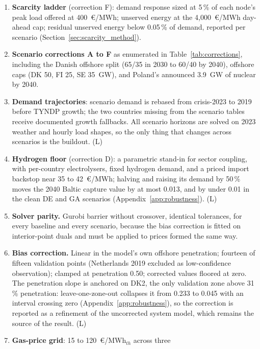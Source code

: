 \begin{enumerate}
    de-rating or reservations). Same direction and same treatment as the
    previous item: absorbed into the measured, corrected bias. (L)
    \item \textbf{Scarcity ladder} (correction F): demand response sized at
    5\,\% of each node's peak load offered at 400~\euro/MWh; unserved
    energy at the 4,000~\euro/MWh day-ahead cap; residual unserved energy
    below 0.05\,\% of demand, reported per scenario
    (Section~\ref{sec:scarcity_method}).
    \item \textbf{Scenario corrections A to F} as enumerated in
    Table~\ref{tab:corrections}, including the Danish offshore split
    (65/35 in 2030 to 60/40 by 2040), offshore caps (DK 50, FI 25, SE 35~GW), and
    Poland's announced 3.9~GW of nuclear by 2040.
    \item \textbf{Demand trajectories}: scenario demand is rebased from
    crisis-2023 to 2019 before TYNDP growth; the two countries missing from the scenario tables receive documented growth
fallbacks. All scenario
    horizons are solved on 2023 weather and hourly load shapes, so the only thing that changes across scenarios is the buildout. (L)
    \item \textbf{Hydrogen floor} (correction D): a parametric stand-in
    for sector coupling, with per-country electrolysers, fixed hydrogen
    demand, and a priced import backstop near 35 to 42~\euro/MWh; halving and
    raising its demand by 50\,\% moves the 2040 Baltic capture value by at most
    0.013, and by under 0.01 in the clean DE and GA scenarios
    (Appendix~\ref{app:robustness}). (L)
    \item \textbf{Solver parity.} Gurobi barrier without crossover,
    identical tolerances, for every baseline and every scenario, because
    the bias correction is fitted on interior-point duals and must be
    applied to prices formed the same way.
    \item \textbf{Bias correction.} Linear in the model's own offshore
    penetration; fourteen of fifteen validation points (Netherlands 2019
    excluded as low-confidence observation); clamped at penetration 0.50;
    corrected values floored at zero. The penetration slope is anchored on DK2,
    the only validation zone above 31\,\% penetration: leave-one-zone-out
    collapses it from 0.233 to 0.045 with an interval crossing zero
    (Appendix~\ref{app:robustness}), so the correction is reported as a refinement of the uncorrected system model, which remains the
    source of the result. (L)
    \item \textbf{Gas-price grid}: 15 to 120~\euro/MWh$_{th}$ across three

\end{enumerate}
